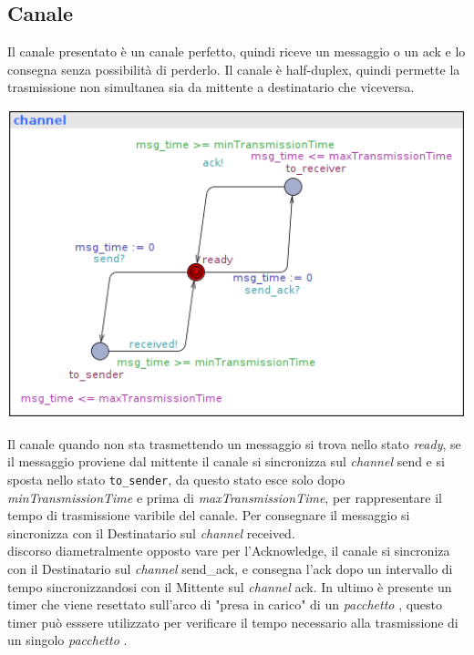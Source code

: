 \documentclass[a4paper]{article}
\newcommand{\channel}{\textit{channel }}
\newcommand{\pacchetto}{\textit{pacchetto }}
\begin{document}
\subsection{Canale}
Il canale presentato è un canale perfetto, quindi riceve un messaggio o un ack e lo consegna senza possibilità di perderlo.
Il canale è half-duplex, quindi permette la trasmissione non simultanea sia da mittente a destinatario che viceversa.\\
\begin{center}\includegraphics[width=1\textwidth]{channel_safe.png}\end{center}
Il canale quando non sta trasmettendo un messaggio si trova nello stato \textit{ready}, se il messaggio proviene dal mittente il canale si sincronizza sul \channel send e si sposta nello stato \texttt{to\_sender}, da questo stato esce solo dopo \textit{minTransmissionTime} e prima di \textit{maxTransmissionTime}, per rappresentare il tempo di trasmissione varibile del canale.
Per consegnare il messaggio si sincronizza con il Destinatario sul \channel received.\\
discorso diametralmente opposto vare per l'Acknowledge, il canale si sincroniza con il Destinatario sul \channel send\_ack, e consegna l'ack dopo un intervallo di tempo sincronizzandosi con il Mittente sul \channel ack.
In ultimo è presente un timer che viene resettato sull'arco di "presa in carico" di un \pacchetto, questo timer può esssere utilizzato per verificare il tempo necessario alla trasmissione di un singolo \pacchetto.
\end{document}
